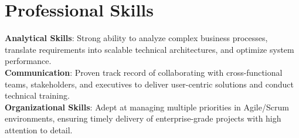 \documentclass[letterpaper,11pt]{article}
\begin{document}
\section{Professional Skills}
 \begin{itemize}[leftmargin=0.15in, label={}]
    \small{\item{
     \textbf{Analytical Skills}{: Strong ability to analyze complex business processes, translate requirements into scalable technical architectures, and optimize system performance.} \\
     \textbf{Communication}{: Proven track record of collaborating with cross-functional teams, stakeholders, and executives to deliver user-centric solutions and conduct technical training.} \\
     \textbf{Organizational Skills}{: Adept at managing multiple priorities in Agile/Scrum environments, ensuring timely delivery of enterprise-grade projects with high attention to detail.}
    }}
 \end{itemize}
\end{document}
